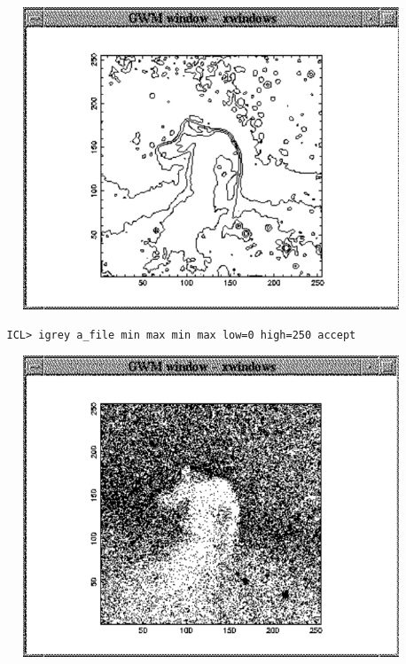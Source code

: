 \documentclass[11pt,twoside]{article}
\begin{document}
\begin{figure}[htb]
\begin{center}
\includegraphics{sun86_icont}
\end{center}
\end{figure}

\begin{verbatim}
   ICL> igrey a_file min max min max low=0 high=250 accept
\end{verbatim}

\begin{figure}[htb]
\begin{center}
\includegraphics{sun86_igrey}
\end{center}
\end{figure}
\end{document}
